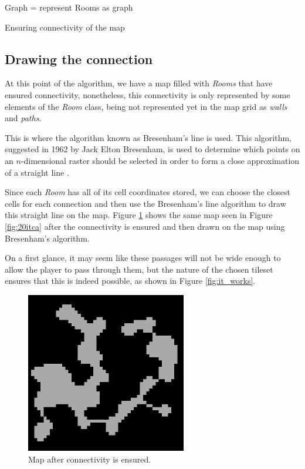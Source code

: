 \begin{algorithm}[h]
 \DontPrintSemicolon
 Graph = represent Rooms as graph\;
 \caption{Ensuring connectivity of the map}
\label{alg:connectivity}
\end{algorithm} 

\subsection{Drawing the connection}

At this point of the algorithm, we have a map filled with \emph{Rooms} that have ensured connectivity, nonetheless, this connectivity is only represented by some elements of the \emph{Room} class, being not represented yet in the map grid as \emph{walls} and \emph{paths}.

This is where the algorithm known as Bresenham's line is used. This algorithm, suggested in 1962 by Jack Elton Bresenham, is used to determine which points on an \(n\)-dimensional raster should be selected in order to form a close approximation of a straight line \cite{bresenham:1965}. 

Since each \emph{Room} has all of its cell coordinates stored, we can choose the closest cells for each connection and then use the Bresenham's line algorithm to draw this straight line on the map. Figure \ref{fig:map_connected} shows the same map seen in Figure \ref{fig:20itca} after the connectivity is ensured and then drawn on the map using Bresenham's algorithm.

On a first glance, it may seem like these passages will not be wide enough to allow the player to pass through them, but the nature of the chosen tileset ensures that this is indeed possible, as shown in Figure \ref{fig:it_works}.

\begin{figure}[h]
    \caption{Map after connectivity is ensured.}
    \centerline{\includegraphics[width=7cm]{images/development/after_connection.png}}
    \label{fig:map_connected}
\end{figure}

